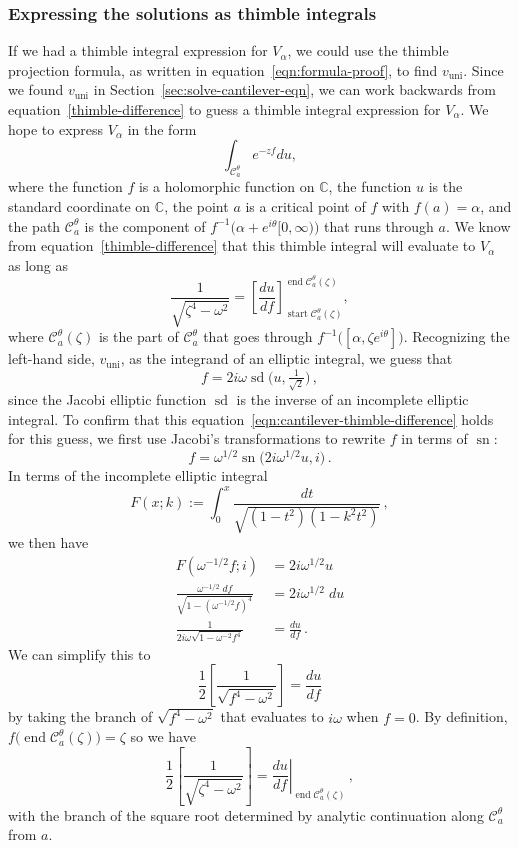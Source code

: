 \documentclass{article}
\newcommand{\C}{\mathbb{C}}
\theoremstyle{definition}
\theoremstyle{plain}
\begin{document}
\subsubsection{Expressing the solutions as thimble integrals}
If we had a thimble integral expression for $V_\alpha$, we could use the thimble projection formula, as written in equation~\eqref{eqn:formula-proof}, to find $v_\text{uni}$. Since we found $v_\text{uni}$ in Section~\ref{sec:solve-cantilever-eqn}, we can work backwards from equation~\eqref{thimble-difference} to guess a thimble integral expression for $V_\alpha$. We hope to express $V_\alpha$ in the form
\[ \int_{\mathcal{C}_a^\theta}e^{-z f} du, \]
where the function $f$ is a holomorphic function on $\C$, the function $u$ is the standard coordinate on $\C$, the point $a$ is a critical point of $f$ with $f(a) = \alpha$, and the path $\mathcal{C}_a^\theta$ is the component of $f^{-1}\big(\alpha + e^{i\theta}[0, \infty)\big)$ that runs through $a$. We know from equation~\eqref{thimble-difference} that this thimble integral will evaluate to $V_\alpha$ as long as
\begin{equation}\label{eqn:cantilever-thimble-difference}
\frac{1}{\sqrt{\zeta^4-\omega^2}} = \left[\frac{du}{df}\right]_{\operatorname{start} \mathcal{C}_a^\theta(\zeta)}^{\operatorname{end} \mathcal{C}_a^\theta(\zeta)},
\end{equation}
where $\mathcal{C}_a^\theta(\zeta)$ is the part of $\mathcal{C}_a^\theta$ that goes through $f^{-1}\big([\alpha,\zeta e^{i\theta}]\big)$. Recognizing the left-hand side, $v_\text{uni}$, as the integrand of an elliptic integral, we guess that
\[ f = 2i\omega \operatorname{sd}\big(u, \tfrac{1}{\sqrt{2}}\big)\,, \]
since the Jacobi elliptic function $\operatorname{sd}$ is the inverse of an incomplete elliptic integral. To confirm that this equation~\eqref{eqn:cantilever-thimble-difference} holds for this guess, we first use Jacobi's transformations to rewrite $f$ in terms of $\operatorname{sn}$:
\[ f = \omega^{1/2} \operatorname{sn}\big(2i \omega^{1/2} u, i\big)\,. \]
In terms of the incomplete elliptic integral
\[ F(x; k) := \int_0^x \frac{dt}{\sqrt{(1-t^2)(1-k^2t^2)}}\,, \]
we then have
\begin{align*}
F(\omega^{-1/2} f; i) & = 2i \omega^{1/2} u \\
\frac{\omega^{-1/2}\;df}{\sqrt{1 - (\omega^{-1/2} f)^4}} & = 2i \omega^{1/2}\;du \\
\frac{1}{2i \omega \sqrt{1 - \omega^{-2} f^4}} & = \frac{du}{df}\,.
\end{align*}
We can simplify this to
\[ \frac{1}{2}\left[\frac{1}{\sqrt{f^4 - \omega^2}}\right] = \frac{du}{df} \]
by taking the branch of $\sqrt{f^4 - \omega^2}$ that evaluates to $i\omega$ when $f = 0$. By definition, $f\big(\operatorname{end} \mathcal{C}_a^\theta(\zeta)\big) = \zeta$
so we have
\begin{equation}\label{eqn:cantilever-endpoint}
\frac{1}{2}\left[\frac{1}{\sqrt{\zeta^4 - \omega^2}}\right] = \left.\frac{du}{df}\right|_{\operatorname{end} \mathcal{C}_a^\theta(\zeta)}\,,
\end{equation}
with the branch of the square root determined by analytic continuation along $\mathcal{C}_a^\theta$ from $a$.
\end{document}
